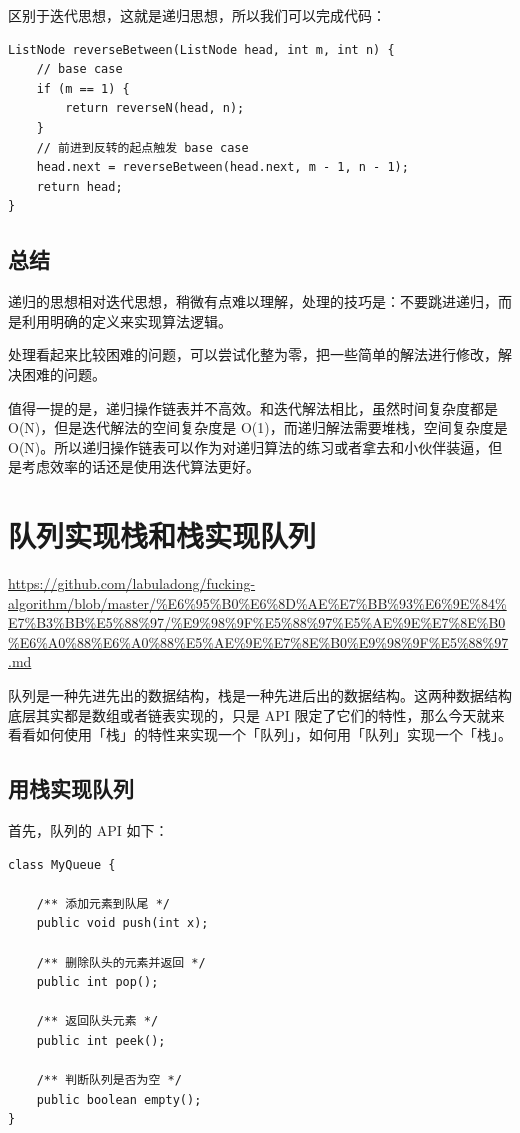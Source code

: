 \documentclass[12pt]{article}
\begin{document}
区别于迭代思想，这就是递归思想，所以我们可以完成代码：
\begin{lstlisting}
ListNode reverseBetween(ListNode head, int m, int n) {
    // base case
    if (m == 1) {
        return reverseN(head, n);
    }
    // 前进到反转的起点触发 base case
    head.next = reverseBetween(head.next, m - 1, n - 1);
    return head;
}
\end{lstlisting}

\subsection{总结}
递归的思想相对迭代思想，稍微有点难以理解，处理的技巧是：不要跳进递归，而是利用明确的定义来实现算法逻辑。

处理看起来比较困难的问题，可以尝试化整为零，把一些简单的解法进行修改，解决困难的问题。

值得一提的是，递归操作链表并不高效。和迭代解法相比，虽然时间复杂度都是 O(N)，但是迭代解法的空间复杂度是 O(1)，而递归解法需要堆栈，空间复杂度是 O(N)。所以递归操作链表可以作为对递归算法的练习或者拿去和小伙伴装逼，但是考虑效率的话还是使用迭代算法更好。

\section{队列实现栈和栈实现队列}
\url{https://github.com/labuladong/fucking-algorithm/blob/master/%E6%95%B0%E6%8D%AE%E7%BB%93%E6%9E%84%E7%B3%BB%E5%88%97/%E9%98%9F%E5%88%97%E5%AE%9E%E7%8E%B0%E6%A0%88%E6%A0%88%E5%AE%9E%E7%8E%B0%E9%98%9F%E5%88%97.md}

队列是一种先进先出的数据结构，栈是一种先进后出的数据结构。这两种数据结构底层其实都是数组或者链表实现的，只是 API 限定了它们的特性，那么今天就来看看如何使用「栈」的特性来实现一个「队列」，如何用「队列」实现一个「栈」。

\subsection{用栈实现队列}
首先，队列的 API 如下：
\begin{lstlisting}
class MyQueue {
    
    /** 添加元素到队尾 */
    public void push(int x);
    
    /** 删除队头的元素并返回 */
    public int pop();
    
    /** 返回队头元素 */
    public int peek();
    
    /** 判断队列是否为空 */
    public boolean empty();
}
\end{lstlisting}
\end{document}
